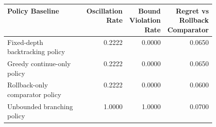 \begin{tabular}{p{0.50\linewidth}rrr}
\hline
Policy Baseline & Oscillation Rate & Bound Violation Rate & Regret vs Rollback Comparator \\
\hline
Fixed-depth backtracking policy & 0.2222 & 0.0000 & 0.0650 \\
Greedy continue-only policy & 0.2222 & 0.0000 & 0.0650 \\
Rollback-only comparator policy & 0.2222 & 0.0000 & 0.0600 \\
Unbounded branching policy & 1.0000 & 1.0000 & 0.0700 \\
\hline
\end{tabular}
